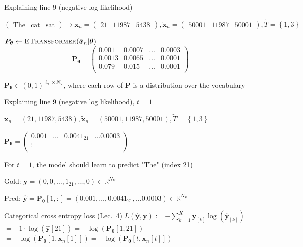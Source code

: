 \documentclass[12pt,aspectratio=169,handout]{beamer}
\begin{document}
\begin{frame}{Explaining line 9 (negative log likelihood)}
	
	$
	\begin{pmatrix}
		\text{The} &
		\text{cat} &
		\text{sat}
	\end{pmatrix}
	\rightarrow
	\bm{x}_n =
	\begin{pmatrix}
		21 &
		11987 &
		5438 
	\end{pmatrix},
	\bm{\tilde{x}}_n =
	\begin{pmatrix}
		50001 &
		11987 &
		50001
	\end{pmatrix},
	\tilde{T} = \left\{ 1, 3 \right\}
	$
	
	$\bm{P_{\theta}} \gets \textsc{ETransformer}(\tilde{\bm{x}}_n | \bm{\theta})$
	$$
	\bm{P_{\theta}} =
	\begin{pmatrix}
		0.001 & 0.0007 & \ldots & 0.0003 \\
		0.0013 & 0.0065 & \ldots & 0.0001 \\
		0.079 & 0.015 & \ldots & 0.0001 \\
	\end{pmatrix}
	$$
	
	$\bm{P_{\theta}} \in (0,1)^{\ell_{\text{x}} \times N_{\text{V}}}$, where each row of $\bm{P}$ is a distribution over the vocabulary
	
\end{frame}


\begin{frame}{Explaining line 9 (negative log likelihood), $t = 1$}
	
	\begin{small}
		$\bm{x}_n = (21, 11987, 5438), \bm{\tilde{x}}_n = (50001, 11987, 50001), \tilde{T} = \left\{ 1, 3 \right\}$
		
		$
		\bm{P_{\theta}} =
		\begin{pmatrix}
			0.001 & \ldots & 0.0041_{21} & \ldots 0.0003 \\
			\vdots &  &  &  \\
		\end{pmatrix}
		$
	\end{small}	
	
	For $t = 1$, the model should learn to predict "The" (index 21)
	
	Gold: $\bm{y} = (0, 0, \ldots, 1_{21}, \ldots, 0) \in \mathbb{R}^{N_{\text{V}}}$
	
	Pred: $\bm{\hat{y}} = \bm{P_{\theta}}[1,:] = (0.001, \ldots, 0.0041_{21}, \ldots 0.0003) \in \mathbb{R}^{N_{\text{V}}}$
	
	\begin{block}{Categorical cross entropy loss (Lec.\ 4)}
		$L (\bm{\hat{y}, \bm{y}}) := - \sum_{k = 1}^{K} \bm{y}_{[k]} \log \left(  \bm{\hat{y}}_{[k]} \right)$ \\
		$= - 1 \cdot \log (\bm{\hat{y}}[21])
		= - \log(\bm{P_{\theta}}[1, 21])$ \\
		$= - \log(\bm{P_{\theta}}[1, \bm{x}_n[1]]) 
		= - \log(\bm{P_{\theta}}[t, \bm{x}_n[t]])$	
	\end{block}
	
\end{frame}
\end{document}
